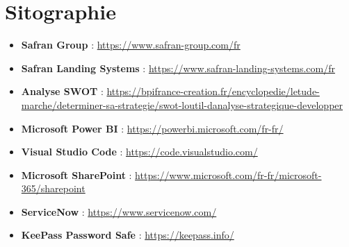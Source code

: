 \newpage
\section*{Sitographie}
\begin{itemize}
  \item \textbf{Safran Group} : \url{https://www.safran-group.com/fr}
  \item \textbf{Safran Landing Systems} : \url{https://www.safran-landing-systems.com/fr}
  \item \textbf{Analyse SWOT} : \url{https://bpifrance-creation.fr/encyclopedie/letude-marche/determiner-sa-strategie/swot-loutil-danalyse-strategique-developper}
  \item \textbf{Microsoft Power BI} : \url{https://powerbi.microsoft.com/fr-fr/}
  \item \textbf{Visual Studio Code} : \url{https://code.visualstudio.com/}
  \item \textbf{Microsoft SharePoint} : \url{https://www.microsoft.com/fr-fr/microsoft-365/sharepoint}
  \item \textbf{ServiceNow} : \url{https://www.servicenow.com/}
  \item \textbf{KeePass Password Safe} : \url{https://keepass.info/}
\end{itemize}

\newpage
